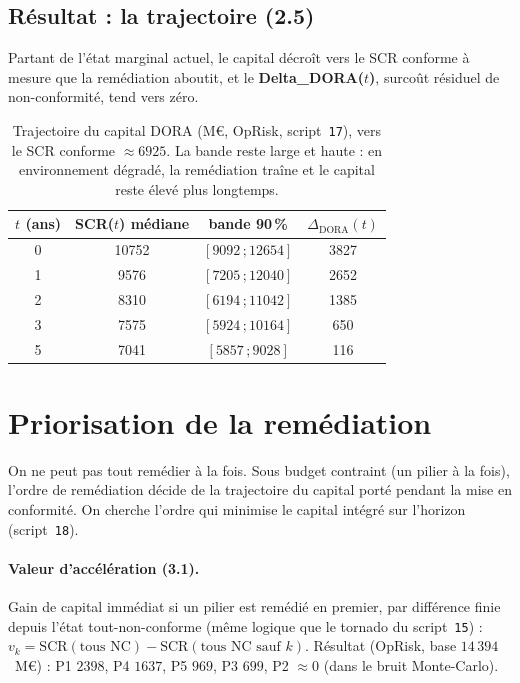 \documentclass[11pt,a4paper]{article}
\begin{document}
\subsection{Résultat : la trajectoire (2.5)}

Partant de l'état marginal actuel, le capital décroît vers le SCR conforme à mesure que la
remédiation aboutit, et le \textbf{Delta\_DORA($t$)}, surcoût résiduel de non-conformité, tend
vers zéro.

\begin{table}[h]\centering\small
\renewcommand{\arraystretch}{1.25}
\begin{tabular}{@{}c ccc@{}}
\toprule
$t$ (ans) & SCR($t$) médiane & bande 90\,\% & $\Delta_{\text{DORA}}(t)$ \\
\midrule
0 & 10752 & $[9092\,;12654]$ & 3827 \\
1 & 9576  & $[7205\,;12040]$ & 2652 \\
2 & 8310  & $[6194\,;11042]$ & 1385 \\
3 & 7575  & $[5924\,;10164]$ & 650 \\
5 & 7041  & $[5857\,;9028]$  & 116 \\
\bottomrule
\end{tabular}
\caption{Trajectoire du capital DORA (M\euro, OpRisk, script~\texttt{17}), vers le SCR conforme
$\approx 6925$. La bande reste large et haute : en environnement dégradé, la remédiation traîne
et le capital reste élevé plus longtemps.}
\end{table}

\section{Priorisation de la remédiation}
\label{sec:priorisation}

On ne peut pas tout remédier à la fois. Sous budget contraint (un pilier à la fois), l'ordre
de remédiation décide de la trajectoire du capital porté pendant la mise en conformité. On
cherche l'ordre qui minimise le capital intégré sur l'horizon (script~\texttt{18}).

\paragraph{Valeur d'accélération (3.1).} Gain de capital immédiat si un pilier est remédié en
premier, par différence finie depuis l'état tout-non-conforme (même logique que le tornado du
script~\texttt{15}) : $v_k = \mathrm{SCR}(\text{tous NC}) - \mathrm{SCR}(\text{tous NC sauf }k)$.
Résultat (OpRisk, base $14\,394$~M\euro) : P1 $2398$, P4 $1637$, P5 $969$, P3 $699$, P2
$\approx 0$ (dans le bruit Monte-Carlo).
\end{document}
